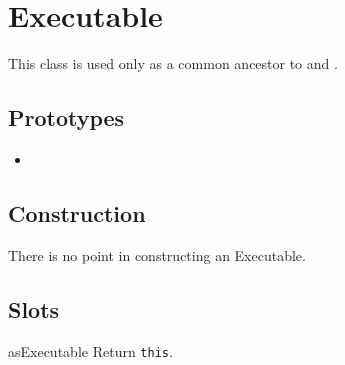
\section{Executable}

This class is used only as a common ancestor to 
and .

\subsection{Prototypes}
\begin{itemize}
\item {}
\end{itemize}

\subsection{Construction}

There is no point in constructing an Executable.

\subsection{Slots}

\begin{urbiscriptapi}
\item[asExecutable] Return \lstinline|this|.
\end{urbiscriptapi}


